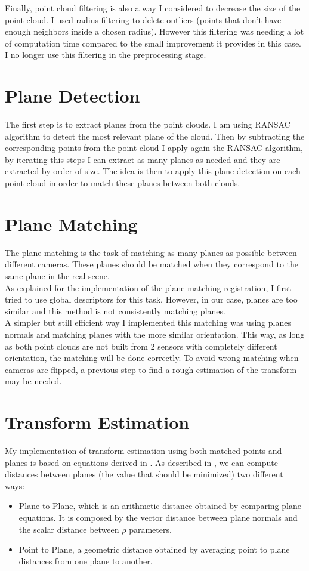 Finally, point cloud filtering is also a way I considered to decrease the size of the point cloud. I used radius filtering to delete outliers (points that don’t have enough neighbors inside a chosen radius). However this filtering was needing a lot of computation time compared to the small improvement it provides in this case. I no longer use this filtering in the preprocessing stage. 

\section{Plane Detection}

The first step is to extract planes from the point clouds. I am using RANSAC algorithm to detect the most relevant plane of the cloud. Then by subtracting the corresponding points from the point cloud I apply again the RANSAC algorithm, by iterating this steps I can extract as many planes as needed and they are extracted by order of size. The idea is then to apply this plane detection on each point cloud in order to match these planes between both clouds. 

\section{Plane Matching}

The plane matching is the task of matching as many planes as possible between different cameras. These planes should be matched when they correspond to the same plane in the real scene. \\
As explained for the implementation of the plane matching registration, I first tried to use global descriptors for this task. However, in our case, planes are too similar and this method is not consistently matching planes. \\
A simpler but still efficient way I implemented this matching was using planes normals and matching planes with the more similar orientation. This way, as long as both point clouds are not built from 2 sensors with completely different orientation, the matching will be done correctly. To avoid wrong matching when cameras are flipped, a previous step to find a rough estimation of the transform may be needed.

\section{Transform Estimation}

My implementation of transform estimation using both matched points and planes is based on equations derived in \cite{ytaguchi2013}. As described in \cite{khoshelham2016}, we can compute distances between planes (the value that should be minimized) two different ways:
\begin{itemize}
    \item Plane to Plane, which is an arithmetic distance obtained by comparing plane equations. It is composed by the vector distance between plane normals and the scalar distance between $\rho$ parameters. 
    \item Point to Plane, a geometric distance obtained by averaging point to plane distances from one plane to another.
\end{itemize}

